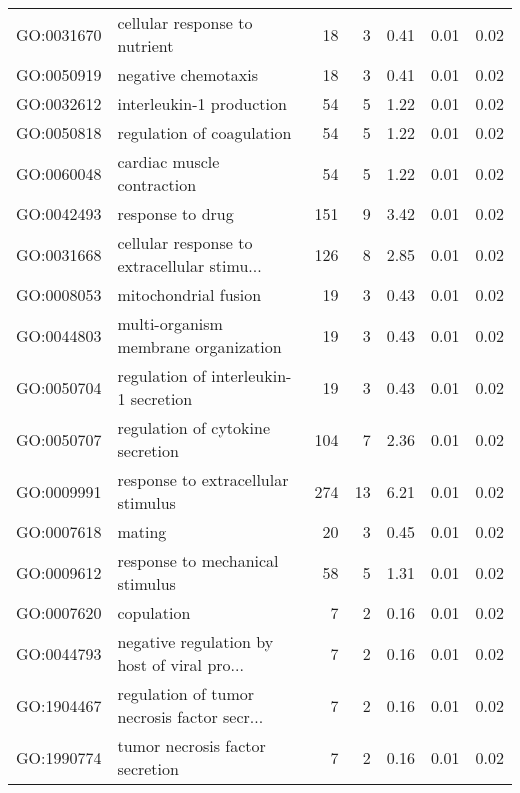 \begin{table}[ht]
\begin{tabular}{llrrrrr}
  GO:0031670 & cellular response to nutrient &  18 &   3 & 0.41 & 0.01 & 0.02 \\ 
  GO:0050919 & negative chemotaxis &  18 &   3 & 0.41 & 0.01 & 0.02 \\ 
  GO:0032612 & interleukin-1 production &  54 &   5 & 1.22 & 0.01 & 0.02 \\ 
  GO:0050818 & regulation of coagulation &  54 &   5 & 1.22 & 0.01 & 0.02 \\ 
  GO:0060048 & cardiac muscle contraction &  54 &   5 & 1.22 & 0.01 & 0.02 \\ 
  GO:0042493 & response to drug & 151 &   9 & 3.42 & 0.01 & 0.02 \\ 
  GO:0031668 & cellular response to extracellular stimu... & 126 &   8 & 2.85 & 0.01 & 0.02 \\ 
  GO:0008053 & mitochondrial fusion &  19 &   3 & 0.43 & 0.01 & 0.02 \\ 
  GO:0044803 & multi-organism membrane organization &  19 &   3 & 0.43 & 0.01 & 0.02 \\ 
  GO:0050704 & regulation of interleukin-1 secretion &  19 &   3 & 0.43 & 0.01 & 0.02 \\ 
  GO:0050707 & regulation of cytokine secretion & 104 &   7 & 2.36 & 0.01 & 0.02 \\ 
  GO:0009991 & response to extracellular stimulus & 274 &  13 & 6.21 & 0.01 & 0.02 \\ 
  GO:0007618 & mating &  20 &   3 & 0.45 & 0.01 & 0.02 \\ 
  GO:0009612 & response to mechanical stimulus &  58 &   5 & 1.31 & 0.01 & 0.02 \\ 
  GO:0007620 & copulation &   7 &   2 & 0.16 & 0.01 & 0.02 \\ 
  GO:0044793 & negative regulation by host of viral pro... &   7 &   2 & 0.16 & 0.01 & 0.02 \\ 
  GO:1904467 & regulation of tumor necrosis factor secr... &   7 &   2 & 0.16 & 0.01 & 0.02 \\ 
  GO:1990774 & tumor necrosis factor secretion &   7 &   2 & 0.16 & 0.01 & 0.02 \\ 
   \hline
\end{tabular}
\end{table}
